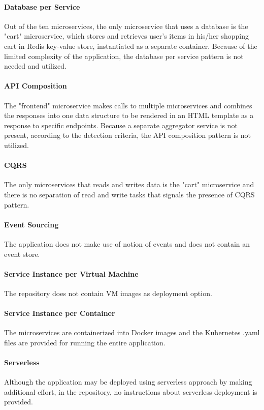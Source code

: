 \documentclass{Configuration_Files/PoliMi3i_thesis}
\begin{document}
\paragraph{Database per Service} Out of the ten microservices, the only microservice that uses a database is the "cart" microservice, which stores and retrieves user's items in his/her shopping cart in Redis key-value store, instantiated as a separate container.
Because of the limited complexity of the application, the database per service pattern is not needed and utilized.

\paragraph{API Composition} The "frontend" microservice makes calls to multiple microservices and combines the responses into one data structure to be rendered in an HTML template as a response to specific endpoints.
Because a separate aggregator service is not present, according to the detection criteria, the API composition pattern is not utilized.

\paragraph{CQRS} The only microservices that reads and writes data is the "cart" microservice and there is no separation of read and write tasks that signals the presence of CQRS pattern.

\paragraph{Event Sourcing} The application does not make use of notion of events and does not contain an event store.

\paragraph{Service Instance per Virtual Machine} The repository does not contain VM images as deployment option.

\paragraph{Service Instance per Container} The microservices are containerized into Docker images and the Kubernetes .yaml files are provided for running the entire application.

\paragraph{Serverless} Although the application may be deployed using serverless approach by making additional effort, in the repository, no instructions about serverless deployment is provided.
\end{document}
